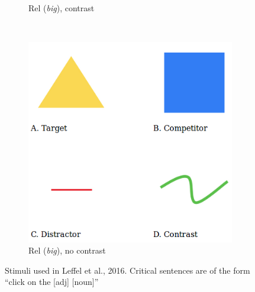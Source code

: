 \documentclass[10pt,letterpaper]{article}
\begin{document}
\begin{figure}[ht]
\begin{subfigure}[b]{0.2\textwidth}
    \caption{Rel (\emph{big}), contrast}
    \label{fig:relcontrast}
  \end{subfigure}
  \qquad
  ~ %
  \begin{subfigure}[b]{0.2\textwidth}
    \includegraphics[width=\textwidth]{plots/scene33nc.png}
    \caption{Rel (\emph{big}), no contrast}
    \label{fig:relnocontrast}
  \end{subfigure}
  \caption{Stimuli used in Leffel et al., 2016. Critical sentences are of the form ``click on the [adj] [noun]''}
  \vspace{-2ex}
  \label{fig:stimuli}
\end{figure}
\end{document}
